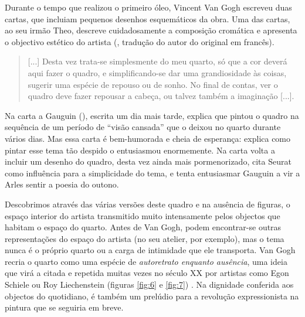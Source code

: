 \documentclass{article}
\begin{document}
Durante o tempo que realizou o primeiro óleo, Vincent Van Gogh
escreveu duas cartas, que incluiam pequenos desenhos esquemáticos da
obra. Uma das cartas, ao seu irmão Theo, descreve cuidadosamente a
composição cromática e apresenta o objectivo estético do artista
(\cite{facsimile}, tradução do autor do original em francês).

\begin{quote}
  [...]  Desta vez trata-se simplesmente do meu quarto, só que a cor
  deverá aqui fazer o quadro, e simplificando-se dar uma grandiosidade
  às coisas, sugerir uma espécie de repouso ou de sonho. No final de
  contas, ver o quadro deve fazer repousar a cabeça, ou talvez também
  a imaginação [...].
\end{quote}

Na carta a Gauguin (\cite{facsimile2}), escrita um dia mais tarde,
explica que pintou o quadro na sequência de um período de ``visão
cansada'' que o deixou no quarto durante vários dias. Mas essa carta é
bem-humorada e cheia de esperança: explica como pintar esse tema tão
despido o entusiasmou enormemente. Na carta volta a incluir um desenho
do quadro, desta vez ainda mais pormenorizado, cita Seurat como
influência para a simplicidade do tema, e tenta entusiasmar Gauguin a
vir a Arles sentir a poesia do outono.

Descobrimos através das várias versões deste quadro e na ausência de
figuras, o espaço interior do artista transmitido muito intensamente
pelos objectos que habitam o espaço do quarto. Antes de Van Gogh,
podem encontrar-se outras representações do espaço do artista (no seu
atelier, por exemplo), mas o tema nunca é o próprio quarto ou a carga
de intimidade que ele transporta. Van Gogh recria o quarto como uma
espécie de \emph{autoretrato enquanto ausência}, uma ideia que virá a
citada e repetida muitas vezes no século XX por artistas como Egon
Schiele ou Roy Liechenstein (figuras \ref{fig:6} e \ref{fig:7}) . Na
dignidade conferida aos objectos do quotidiano, é também um prelúdio
para a revolução expressionista na pintura que se seguiria em breve.
\end{document}

